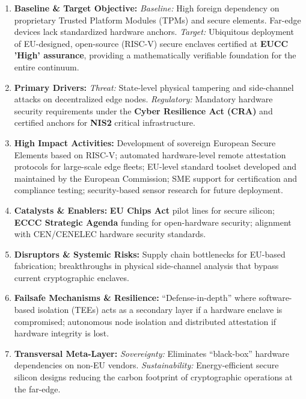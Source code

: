 \documentclass[12pt,a4paper]{report}
\begin{document}
\begin{enumerate}
\item \textbf{Baseline \& Target Objective:}
\textit{Baseline:} High foreign dependency on proprietary Trusted Platform Modules (TPMs) and secure elements. Far-edge devices lack standardized hardware anchors.
\textit{Target:} Ubiquitous deployment of EU-designed, open-source (RISC-V) secure enclaves certified at \textbf{EUCC 'High' assurance}, providing a mathematically verifiable foundation for the entire continuum.

\item \textbf{Primary Drivers:} 
\textit{Threat:} State-level physical tampering and side-channel attacks on decentralized edge nodes. 
\textit{Regulatory:} Mandatory hardware security requirements under the \textbf{Cyber Resilience Act (CRA)} and certified anchors for \textbf{NIS2} critical infrastructure.

\item \textbf{High Impact Activities:} 
Development of sovereign European Secure Elements based on RISC-V; automated hardware-level remote attestation protocols for large-scale edge fleets; EU-level standard toolset developed and maintained by the European Commission; SME support for certification and compliance testing; security-based sensor research for future deployment.

\item \textbf{Catalysts \& Enablers:} 
\textbf{EU Chips Act} pilot lines for secure silicon; \textbf{ECCC Strategic Agenda} funding for open-hardware security; alignment with CEN/CENELEC hardware security standards.

\item \textbf{Disruptors \& Systemic Risks:} 
Supply chain bottlenecks for EU-based fabrication; breakthroughs in physical side-channel analysis that bypass current cryptographic enclaves.

\item \textbf{Failsafe Mechanisms \& Resilience:} 
``Defense-in-depth'' where software-based isolation (TEEs) acts as a secondary layer if a hardware enclave is compromised; autonomous node isolation and distributed attestation if hardware integrity is lost.

\item \textbf{Transversal Meta-Layer:} 
\textit{Sovereignty:} Eliminates ``black-box'' hardware dependencies on non-EU vendors. \textit{Sustainability:} Energy-efficient secure silicon designs reducing the carbon footprint of cryptographic operations at the far-edge.

\end{enumerate}
\end{document}
